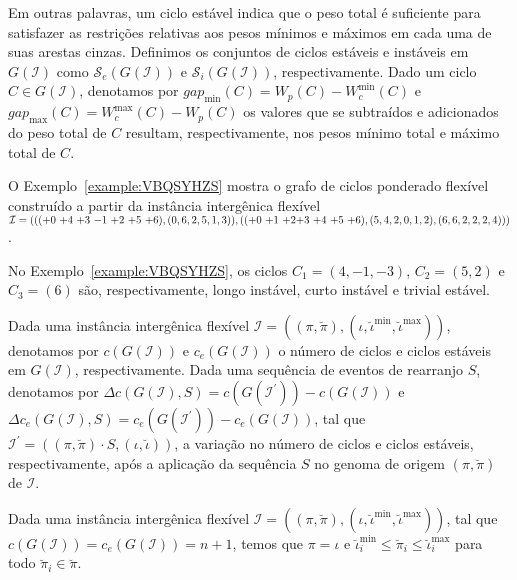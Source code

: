 Em outras palavras, um ciclo estável indica que o peso total é suficiente para satisfazer as restrições relativas aos pesos mínimos e máximos em cada uma de suas arestas cinzas. Definimos os conjuntos de ciclos estáveis e instáveis em $G(\mathcal{I})$ como $\mathcal{S}_e(G(\mathcal{I}))$ e $\mathcal{S}_i(G(\mathcal{I}))$, respectivamente. Dado um ciclo $C \in G(\mathcal{I})$, denotamos por $gap_{\min}(C) = W_p(C) - W^{\min}_c(C)$ e $gap_{\max}(C) = W^{\max}_c(C) - W_p(C)$ os valores que se subtraídos e adicionados do peso total de $C$ resultam, respectivamente, nos pesos mínimo total e máximo total de $C$.

O Exemplo~\ref{example:VBQSYHZS} mostra o grafo de ciclos ponderado flexível construído a partir da instância intergênica flexível $\mathcal{I} = ((({+0}~{+4}~{+3}~{-1}~{+2}~{+5}~{+6}),(0,6,2,5,1,3)),(({+0}~{+1}~{+2}\break{+3}~{+4}~{+5}~{+6}),(5,4,2,0,1,2),(6,6,2,2,2,4)))$.



No Exemplo~\ref{example:VBQSYHZS}, os ciclos $C_1=(4,-1,-3)$, $C_2 = (5,2)$ e $C_3 = (6)$ são, respectivamente, longo instável, curto instável e trivial estável.

Dada uma instância intergênica flexível $\mathcal{I} = ((\pi,\breve\pi),(\iota,\breve\iota^{\min},\breve\iota^{\max}))$, denotamos por $c(G(\mathcal{I}))$ e $c_e(G(\mathcal{I}))$ o número de ciclos e ciclos estáveis em $G(\mathcal{I})$, respectivamente. Dada uma sequência de eventos de rearranjo $S$, denotamos por $\Delta c(G(\mathcal{I}), S) = c(G(\mathcal{I^{\prime}})) - c(G(\mathcal{I}))$ e $\Delta c_e(G(\mathcal{I}), S) = c_e(G(\mathcal{I^{\prime}})) - c_e(G(\mathcal{I}))$, tal que $\mathcal{I^{\prime}} = ((\pi,\breve\pi) \cdot S,(\iota,\breve\iota))$, a variação no número de ciclos e ciclos estáveis, respectivamente, após a aplicação da sequência $S$ no genoma de origem $(\pi,\breve\pi)$ de $\mathcal{I}$.

\begin{remark}\label{remark:IRNWKUZA}
Dada uma instância intergênica flexível $\mathcal{I} = ((\pi,\breve\pi),(\iota,\breve\iota^{\min},\breve\iota^{\max}))$, tal que $c(G(\mathcal{I})) = c_e(G(\mathcal{I})) = n+1$, temos que $\pi = \iota$ e $\breve\iota^{\min}_i \le \breve\pi_i \le \breve\iota^{\max}_i$ para todo $\breve\pi_i \in \breve\pi$.
\end{remark}

